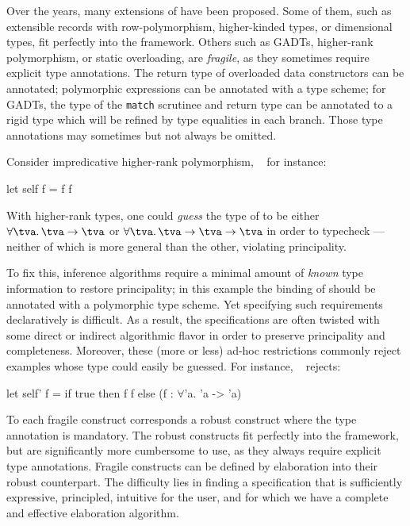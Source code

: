 \documentclass[acmsmall,screen,nonacm,review]{acmart}
\begin{document}

Over the years, many extensions of \ML have been proposed. Some of
them, such as extensible records with row-polymorphism, higher-kinded
types, or dimensional types, fit perfectly into the \ML
framework. Others such as GADTs, higher-rank polymorphism, or static
overloading, are \emph{fragile}, as they sometimes require explicit
type annotations. The return type of overloaded data constructors can
be annotated; polymorphic expressions can be annotated with a type
scheme; for GADTs, the type of the \texttt{match} scrutinee and return
type can be annotated to a rigid type which will be refined by type
equalities in each branch. Those type annotations may sometimes but
not always be omitted.

Consider impredicative higher-rank polymorphism,
\MLF~\cite{LeBotlan-Remy/recasting-mlf} for instance:
\begin{program}[input]
  let self f = f f
\end{program}
With higher-rank types, one could \emph{guess} the type of  to be
either $\tfor \tv \tv \to \tv$ or $\tfor \tv \tv \to \tv \to \tv$ in order
to typecheck ---neither of which is more general than the other,
violating principality.


To fix this, inference algorithms require a minimal amount of
\emph{known} type information to restore principality; in this example
the binding of  should be annotated with a polymorphic type
scheme. Yet specifying such requirements declaratively is
difficult. As a result, the specifications are often twisted with some
direct or indirect algorithmic flavor in order to preserve
principality and completeness.
%
Moreover, these (more or less) ad-hoc restrictions commonly reject examples
whose type could easily be guessed. For instance, \MLF~ rejects:
\begin{program}[input]
  let self' f = if true then f f else (f : $\forall$'a. 'a -> 'a)
\end{program}




To each fragile construct
corresponds a robust construct where the type annotation is mandatory. The
robust constructs fit perfectly into the \ML framework, but are
significantly more cumbersome to use, as they always require explicit type
annotations. Fragile constructs can be defined by elaboration into their
robust counterpart.
%
%
The difficulty lies in finding a specification
that is sufficiently expressive, principled, intuitive for the user,
and for which we have a complete and effective elaboration algorithm.
\end{document}

